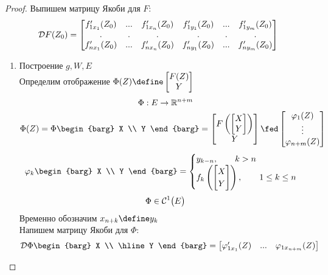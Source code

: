 \begin{proof}
	Выпишем матрицу Якоби для $ F $:
	$$ \mc{D}F(Z_0) =
	\begin{bmatrix}
		f_{1x_1}'(Z_0) & ... & f_{1x_n}'(Z_0) & f_{1y_1}'(Z_0) & ... & f_{1y_m}'(Z_0) \\
		. & . & . & . & . & . \\
		f_{nx_1}'(Z_0) & ... & f_{nx_n}'(Z_0) & f_{ny_1}'(Z_0) & ... & f_{ny_m}'(Z_0)
	\end{bmatrix} $$
	\begin{enumerate}
		\item Построение $ g, W, E $ \\
		Определим отображение $ \Phi(Z) \define
		\begin{bmatrix}
			F(Z) \\
			Y
		\end{bmatrix} $
		$$ \Phi : E \to \R^{n + m} $$
		$$ \Phi(Z) = \Phi
		\begin{barg}
			X \\
			Y
		\end{barg} =
		\begin{bmatrix}
			F \left(
			\begin{bmatrix}
				X \\
				Y
			\end{bmatrix} \right) \\
			Y
		\end{bmatrix} \fed \column{\vphi_1(Z)}{\vphi_{n + m}(Z)} $$
		$$ \vphi_k
		\begin{barg}
			X \\
			Y
		\end{barg} =
		\begin{cases}
			y_{k - n}, \qquad k > n \\
			f_k \left(
		\begin{bmatrix}
			X \\
			Y
		\end{bmatrix} \right), \qquad 1 \le k \le n
		\end{cases} $$
		$$ \Phi \in \Cont[1]{E} $$
		Временно обозначим $ x_{n + k} \define y_k $ \\
		Напишем матрицу Якоби для $ \Phi $:
		\begin{multline*}
			\mc{D}\Phi
			\begin{barg}
				X \\
				\hline
				Y
			\end{barg} =
			\begin{bmatrix}
				\vphi_{1x_1}'(Z) & ... & \vphi_{1x_{n + m}}(Z) \\

\end{bmatrix}
\end{multline*}
\end{enumerate}
\end{proof}
